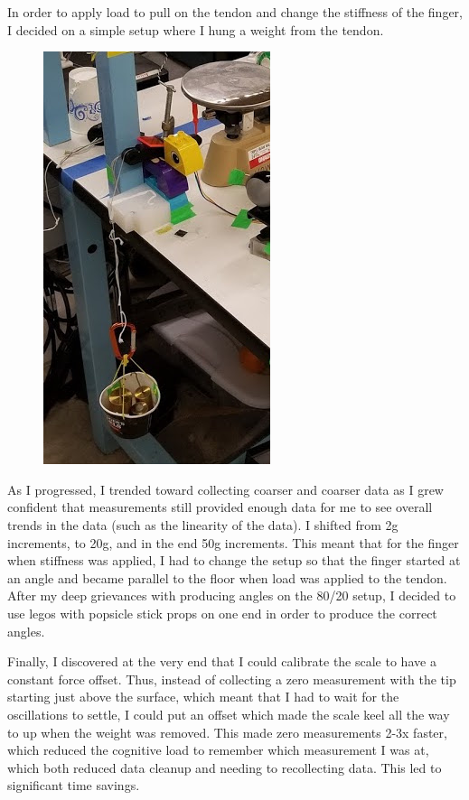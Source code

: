 \documentclass[preprint,12pt,3p]{elsarticle}
\begin{document}
In order to apply load to pull on the tendon and change the stiffness of the finger, I decided on a
simple setup where I hung a weight from the tendon.

\begin{figure}[H]
\centering
\includegraphics[width=.15\textheight]{images/setup/loading.jpg}
\end{figure}%

As I progressed, I trended toward collecting coarser and coarser data as I grew confident
that measurements still provided enough data for me to see overall trends in the data
(such as the linearity of the data). I shifted from 2g increments, to 20g, and in the end 50g
increments. This meant that for the finger when stiffness was applied, I had to change the setup so
that the finger started at an angle and became parallel to the floor when load was applied to the
tendon. After my deep grievances with producing angles on the 80/20 setup, I decided to use legos
with popsicle stick props on one end in order to produce the correct angles.

Finally, I discovered at the very end that I could calibrate the scale to have a constant force
offset. Thus, instead of collecting a zero measurement with the tip starting just above the surface,
which meant that I had to wait for the oscillations to settle, I could put an offset which made the
scale keel all the way to up when the weight was removed. This made zero measurements 2-3x
faster, which reduced the cognitive load to remember which measurement I was at, which both reduced
data cleanup and needing to recollecting data. This led to significant time savings.
\end{document}

